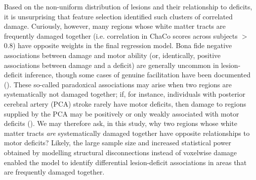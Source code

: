 \documentclass[10pt]{article}
\begin{document}
Based on the non-uniform distribution of lesions and their relationship to deficits, it is unsurprising that feature selection identified such clusters of correlated damage. Curiously, however, many regions whose white matter tracts are frequently damaged together (i.e. correlation in ChaCo scores across subjects $>$0.8) have opposite weights in the final regression model. Bona fide negative associations between damage and motor ability (or, identically, positive associations between damage and a deficit) are generally uncommon in lesion-deficit inference, though some cases of genuine facilitation have been documented (\cite{Kapur1996-xq, Sperber2020-kp}). These so-called paradoxical associations may arise when two regions are systematically not damaged together; if, for instance, individuals with posterior cerebral artery (PCA) stroke rarely have motor deficits, then damage to regions supplied by the PCA may be positively or only weakly associated with motor deficits (\cite{Sperber2020-kp}). We may therefore ask, in this study, why two regions whose white matter tracts \textit{are} systematically damaged together have opposite relationships to motor deficits? Likely, the large sample size and increased statistical power obtained by modelling structural disconnections instead of voxelwise damage enabled the model to identify differential lesion-deficit associations in areas that are frequently damaged together.
\end{document}
